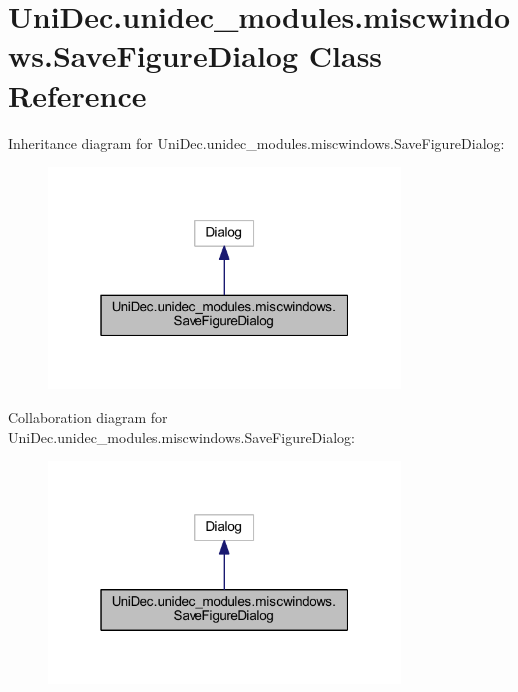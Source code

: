 \hypertarget{class_uni_dec_1_1unidec__modules_1_1miscwindows_1_1_save_figure_dialog}{}\section{Uni\+Dec.\+unidec\+\_\+modules.\+miscwindows.\+Save\+Figure\+Dialog Class Reference}
\label{class_uni_dec_1_1unidec__modules_1_1miscwindows_1_1_save_figure_dialog}


Inheritance diagram for Uni\+Dec.\+unidec\+\_\+modules.\+miscwindows.\+Save\+Figure\+Dialog\+:\nopagebreak
\begin{figure}[H]
\begin{center}
\leavevmode
\includegraphics[width=265pt]{class_uni_dec_1_1unidec__modules_1_1miscwindows_1_1_save_figure_dialog__inherit__graph}
\end{center}
\end{figure}


Collaboration diagram for Uni\+Dec.\+unidec\+\_\+modules.\+miscwindows.\+Save\+Figure\+Dialog\+:\nopagebreak
\begin{figure}[H]
\begin{center}
\leavevmode
\includegraphics[width=265pt]{class_uni_dec_1_1unidec__modules_1_1miscwindows_1_1_save_figure_dialog__coll__graph}
\end{center}
\end{figure}
